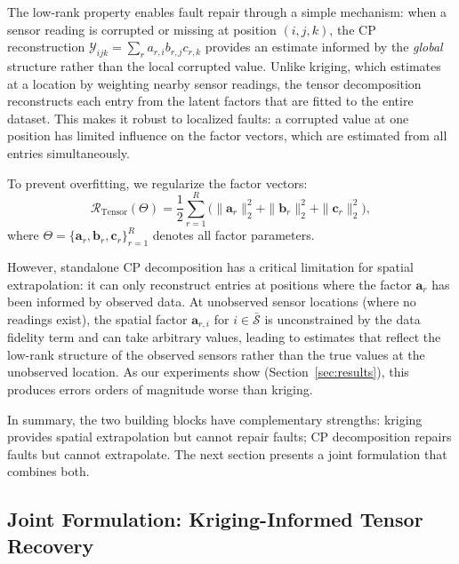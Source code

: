 \documentclass[journal]{IEEEtran}
\newcommand{\Ycal}{\mathcal{Y}}
\newcommand{\Rcal}{\mathcal{R}}
\newcommand{\Sbar}{\bar{\mathcal{S}}}
\begin{document}
The low-rank property enables fault repair through a simple mechanism: when a sensor reading is corrupted or missing at position $(i,j,k)$, the CP reconstruction $\Ycal_{ijk} = \sum_r a_{r,i} b_{r,j} c_{r,k}$ provides an estimate informed by the \emph{global} structure rather than the local corrupted value. Unlike kriging, which estimates at a location by weighting nearby sensor readings, the tensor decomposition reconstructs each entry from the latent factors that are fitted to the entire dataset. This makes it robust to localized faults: a corrupted value at one position has limited influence on the factor vectors, which are estimated from all entries simultaneously.

To prevent overfitting, we regularize the factor vectors:
\begin{equation}\label{eq:reg}
\Rcal_{\mathrm{Tensor}}(\Theta) = \frac{1}{2}\sum_{r=1}^{R}\bigl(\|\mathbf{a}_{r}\|_{2}^{2} + \|\mathbf{b}_{r}\|_{2}^{2} + \|\mathbf{c}_{r}\|_{2}^{2}\bigr),
\end{equation}
where $\Theta = \{\mathbf{a}_r, \mathbf{b}_r, \mathbf{c}_r\}_{r=1}^R$ denotes all factor parameters.

However, standalone CP decomposition has a critical limitation for spatial extrapolation: it can only reconstruct entries at positions where the factor $\mathbf{a}_r$ has been informed by observed data. At unobserved sensor locations (where no readings exist), the spatial factor $\mathbf{a}_{r,i}$ for $i \in \Sbar$ is unconstrained by the data fidelity term and can take arbitrary values, leading to estimates that reflect the low-rank structure of the observed sensors rather than the true values at the unobserved location. As our experiments show (Section~\ref{sec:results}), this produces errors orders of magnitude worse than kriging.

In summary, the two building blocks have complementary strengths: kriging provides spatial extrapolation but cannot repair faults; CP decomposition repairs faults but cannot extrapolate. The next section presents a joint formulation that combines both.

\subsection{Joint Formulation: Kriging-Informed Tensor Recovery}\label{sec:formulation}
\end{document}

